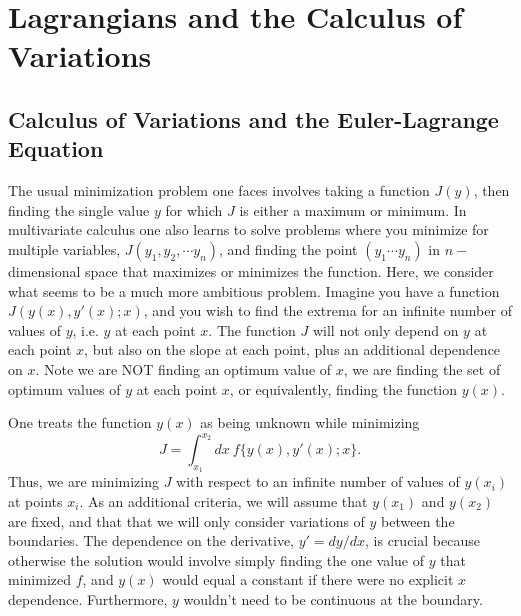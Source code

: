 %

\section{Lagrangians and the Calculus of Variations}
\label{sec:lagrangians}
\bigskip

\subsection{Calculus of Variations and the Euler-Lagrange Equation}

The usual minimization problem one faces involves taking a function
$J(y)$, then finding the single value $y$ for which $J$ is either a
maximum or minimum. In multivariate calculus one also learns to solve
problems where you minimize for multiple variables, $J(y_1,y_2,\cdots
y_n)$, and finding the point $(y_1\cdots y_n)$ in $n-$dimensional
space that maximizes or minimizes the function. Here, we consider what
seems to be a much more ambitious problem. Imagine you have a function
$J(y(x),y'(x);x)$, and you wish to find the extrema for an infinite
number of values of $y$, i.e. $y$ at each point $x$. The function $J$
will not only depend on $y$ at each point $x$, but also on the slope
at each point, plus an additional dependence on $x$. Note we are NOT
finding an optimum value of $x$, we are finding the set of optimum
values of $y$ at each point $x$, or equivalently, finding the function
$y(x)$.

One treats the function $y(x)$ as being unknown while minimizing
\[
J=\int_{x_1}^{x_2}dx~f\{y(x),y'(x);x\}.
\]
Thus, we are minimizing $J$ with respect to an infinite number of
values of $y(x_i)$ at points $x_i$. As an additional criteria, we will
assume that $y(x_1)$ and $y(x_2)$ are fixed, and that that we will
only consider variations of $y$ between the boundaries. The dependence
on the derivative, $y'=dy/dx$, is crucial because otherwise the
solution would involve simply finding the one value of $y$ that
minimized $f$, and $y(x)$ would equal a constant if there were no
explicit $x$ dependence. Furthermore, $y$ wouldn't need to be
continuous at the boundary.

